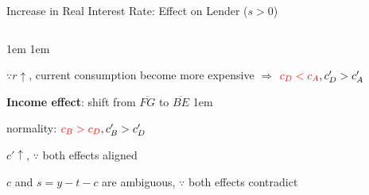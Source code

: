 \documentclass[11pt,aspectratio=43,usenames,dvipsnames]{beamer}
\newcommand{\red}[1]{\textcolor{red}{#1}}
\let\olditemize=\itemize
\let\endolditemize=\enditemize
\renewenvironment{itemize}{\olditemize \itemsep1em}{\endolditemize}
\theoremstyle{definition}
\begin{document}
\begin{frame}{Increase in Real Interest Rate: Effect on Lender ($s > 0$)}
\begin{columns}
\begin{column}{0.5\textwidth}
\begin{itemize}
\begin{itemize}
                    \item $ \because r \uparrow  $, \alert{current consumption become more expensive} $ \Rightarrow  $ $ \red{c_{D} < c_{A}}, c'_{D} > c'_{A} $
                \end{itemize}
                \item \textbf{Income effect}: shift from $ \overline{FG} $ to $ \overline{BE} $
                \begin{itemize}
                    \item normality: $ \red{c_{B} > c_{D}}, c'_{B} > c'_{D} $
                    \item $ c' \uparrow $, $ \because $ both effects aligned
                    \item $ c $ and $ s = y - t - c $ are ambiguous, $ \because $ both effects contradict
                \end{itemize}
            \end{itemize}
        \end{column}
    \end{columns}
\end{frame}
\end{document}
